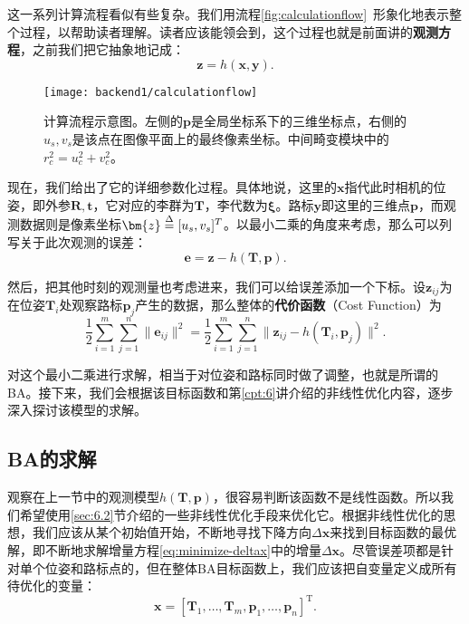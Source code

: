 这一系列计算流程看似有些复杂。我们用流程\autoref{fig:calculationflow}~形象化地表示整个过程，以帮助读者理解。读者应该能领会到，这个过程也就是前面讲的\textbf{观测方程}，之前我们把它抽象地记成：
\begin{equation}
\bm{z} = h(\bm{x}, \bm{y}).
\end{equation}

\begin{figure}[!htp]
	\centering
	\texttt{[image: backend1/calculationflow]}
	\caption{计算流程示意图。左侧的$\bm{p}$是全局坐标系下的三维坐标点，右侧的$u_s,v_s$是该点在图像平面上的最终像素坐标。中间畸变模块中的$r_c^2=u_c^2 + v_c^2$。}
	\label{fig:calculationflow}
\end{figure}

现在，我们给出了它的详细参数化过程。具体地说，这里的$\bm{x}$指代此时相机的位姿，即外参$\bm{R}, \bm{t}$，它对应的李群为$\bm{T}$，李代数为$\bm{\xi}$。路标$\bm{y}$即这里的三维点$\bm{p}$，而观测数据则是像素坐标$\bm{z} \buildrel \Delta \over = [u_s, v_s]^T $。以最小二乘的角度来考虑，那么可以列写关于此次观测的误差：
\begin{equation}
\bm{e} = \bm{z} - h(\bm{T}, \bm{p}).
\end{equation}

然后，把其他时刻的观测量也考虑进来，我们可以给误差添加一个下标。设$\bm{z}_{ij}$为在位姿$\bm{T}_i$处观察路标$\bm{p}_j$产生的数据，那么整体的\textbf{代价函数}（Cost Function）为
\begin{equation}
\label{eq:BAcostfunction}
\frac{1}{2}\sum_{i=1}^m \sum_{j=1}^n \| \bm{e}_{ij} \|^2 = \frac{1}{2}\sum_{i=1}^m\sum_{j=1}^n \|
\bm{{z}}_{ij} - h(\bm{T}_{i},\bm{p}_j) \|^2 .
\end{equation}

对这个最小二乘进行求解，相当于对位姿和路标同时做了调整，也就是所谓的BA。接下来，我们会根据该目标函数和第\ref{cpt:6}讲介绍的非线性优化内容，逐步深入探讨该模型的求解。

\subsection{BA的求解}
观察在上一节中的观测模型$h(\bm{T}, \bm{p})$，很容易判断该函数不是线性函数。所以我们希望使用\ref{sec:6.2}节介绍的一些非线性优化手段来优化它。根据非线性优化的思想，我们应该从某个初始值开始，不断地寻找下降方向$\Delta \bm{x}$来找到目标函数的最优解，即不断地求解增量方程\eqref{eq:minimize-deltax}中的增量$\Delta \bm{x}$。尽管误差项都是针对单个位姿和路标点的，但在整体BA目标函数上，我们应该把自变量定义成所有待优化的变量：
\begin{equation}
\bm{x} = [ \bm{T}_1, \ldots, \bm{T}_m, \bm{p}_1, \ldots, \bm{p}_n ]^\mathrm{T}.
\end{equation}

